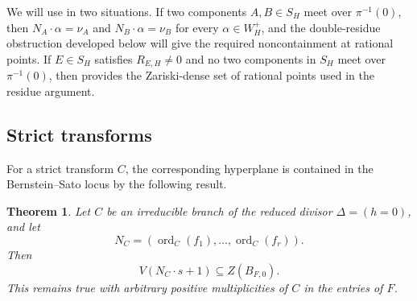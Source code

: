 \documentclass[12pt]{amsart}
\numberwithin{equation}{section}
\theoremstyle{plain}
\newtheorem{theorem}{Theorem}[section]
\theoremstyle{definition}
\theoremstyle{remark}
\theoremstyle{definition}
\DeclareMathOperator{\ord}{ord}
\begin{document}
We will use  in two situations. If two components $A,B\in S_H$ meet over $\pi^{-1}(0)$, then $N_A\cdot\alpha=\nu_A$ and $N_B\cdot\alpha=\nu_B$ for every $\alpha\in W_H^+$, and the double-residue obstruction developed below will give the required noncontainment at rational points. If $E\in S_H$ satisfies $R_{E,H}\neq0$ and no two components in $S_H$ meet over $\pi^{-1}(0)$, then  provides the Zariski-dense set of rational points used in the residue argument.



\subsection{Strict transforms}

For a strict transform $C$, the corresponding hyperplane is contained in the Bernstein--Sato locus by the following result.

\begin{theorem}\label{thm:strict-transform-wall}
Let $C$ be an irreducible branch of the reduced divisor $\Delta=(h=0)$, and let
\[
 N_C=(\ord_C(f_1),\ldots,\ord_C(f_r)).
\]
Then
\begin{equation}\label{eq:strict-transform-wall}
 V(N_C\cdot s+1)
 \subseteq
 Z(B_{F,0}).
\end{equation}
This remains true with arbitrary positive multiplicities of $C$ in the entries of $F$.
\end{theorem}
\end{document}
